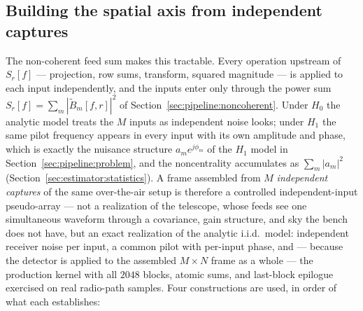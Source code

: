 \subsection*{Building the spatial axis from independent captures}

The non-coherent feed sum makes this tractable. Every operation upstream of $S_r[f]$ --- projection, row sums, transform, squared magnitude --- is applied to each input independently, and the inputs enter only through the power sum $S_r[f] = \sum_m |\tilde B_m[f,r]|^2$ of Section~\ref{sec:pipeline:noncoherent}. Under $H_0$ the analytic model treats the $M$ inputs as independent noise looks; under $H_1$ the same pilot frequency appears in every input with its own amplitude and phase, which is exactly the nuisance structure $a_m e^{j\phi_m}$ of the $H_1$ model in Section~\ref{sec:pipeline:problem}, and the noncentrality accumulates as $\sum_m |a_m|^2$ (Section~\ref{sec:estimator:statistics}). A frame assembled from $M$ \emph{independent captures} of the same over-the-air setup is therefore a controlled independent-input pseudo-array --- not a realization of the telescope, whose feeds see one simultaneous waveform through a covariance, gain structure, and sky the bench does not have, but an exact realization of the analytic i.i.d.\ model: independent receiver noise per input, a common pilot with per-input phase, and --- because the detector is applied to the assembled $M \times N$ frame as a whole --- the production kernel with all $2048$ blocks, atomic sums, and last-block epilogue exercised on real radio-path samples. Four constructions are used, in order of what each establishes:

